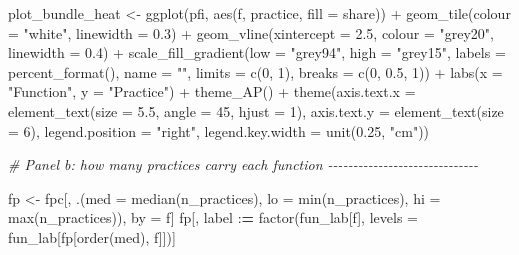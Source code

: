 \documentclass[
  11pt,
]{article}
\newenvironment{Shaded}{\begin{snugshade}}{\end{snugshade}}
\newcommand{\AttributeTok}[1]{\textcolor[rgb]{0.77,0.63,0.00}{#1}}
\newcommand{\CommentTok}[1]{\textcolor[rgb]{0.56,0.35,0.01}{\textit{#1}}}
\newcommand{\DecValTok}[1]{\textcolor[rgb]{0.00,0.00,0.81}{#1}}
\newcommand{\ErrorTok}[1]{\textcolor[rgb]{0.64,0.00,0.00}{\textbf{#1}}}
\newcommand{\FloatTok}[1]{\textcolor[rgb]{0.00,0.00,0.81}{#1}}
\newcommand{\FunctionTok}[1]{\textcolor[rgb]{0.00,0.00,0.00}{#1}}
\newcommand{\NormalTok}[1]{#1}
\newcommand{\OtherTok}[1]{\textcolor[rgb]{0.56,0.35,0.01}{#1}}
\newcommand{\SpecialCharTok}[1]{\textcolor[rgb]{0.00,0.00,0.00}{#1}}
\newcommand{\StringTok}[1]{\textcolor[rgb]{0.31,0.60,0.02}{#1}}
\begin{document}
\begin{Shaded}
\begin{Highlighting}[]
\NormalTok{plot\_bundle\_heat }\OtherTok{\textless{}{-}} \FunctionTok{ggplot}\NormalTok{(pfi, }\FunctionTok{aes}\NormalTok{(f, practice, }\AttributeTok{fill =}\NormalTok{ share)) }\SpecialCharTok{+}
  \FunctionTok{geom\_tile}\NormalTok{(}\AttributeTok{colour =} \StringTok{"white"}\NormalTok{, }\AttributeTok{linewidth =} \FloatTok{0.3}\NormalTok{) }\SpecialCharTok{+}
  \FunctionTok{geom\_vline}\NormalTok{(}\AttributeTok{xintercept =} \FloatTok{2.5}\NormalTok{, }\AttributeTok{colour =} \StringTok{"grey20"}\NormalTok{, }\AttributeTok{linewidth =} \FloatTok{0.4}\NormalTok{) }\SpecialCharTok{+}
  \FunctionTok{scale\_fill\_gradient}\NormalTok{(}\AttributeTok{low =} \StringTok{"grey94"}\NormalTok{, }\AttributeTok{high =} \StringTok{"grey15"}\NormalTok{, }\AttributeTok{labels =} \FunctionTok{percent\_format}\NormalTok{(),}
                      \AttributeTok{name =} \StringTok{""}\NormalTok{, }\AttributeTok{limits =} \FunctionTok{c}\NormalTok{(}\DecValTok{0}\NormalTok{, }\DecValTok{1}\NormalTok{),}
                      \AttributeTok{breaks =} \FunctionTok{c}\NormalTok{(}\DecValTok{0}\NormalTok{, }\FloatTok{0.5}\NormalTok{, }\DecValTok{1}\NormalTok{)) }\SpecialCharTok{+}
  \FunctionTok{labs}\NormalTok{(}\AttributeTok{x =} \StringTok{"Function"}\NormalTok{, }\AttributeTok{y =} \StringTok{"Practice"}\NormalTok{) }\SpecialCharTok{+}
  \FunctionTok{theme\_AP}\NormalTok{() }\SpecialCharTok{+}
  \FunctionTok{theme}\NormalTok{(}\AttributeTok{axis.text.x =} \FunctionTok{element\_text}\NormalTok{(}\AttributeTok{size =} \FloatTok{5.5}\NormalTok{, }\AttributeTok{angle =} \DecValTok{45}\NormalTok{, }\AttributeTok{hjust =} \DecValTok{1}\NormalTok{),}
        \AttributeTok{axis.text.y =} \FunctionTok{element\_text}\NormalTok{(}\AttributeTok{size =} \DecValTok{6}\NormalTok{),}
        \AttributeTok{legend.position =} \StringTok{"right"}\NormalTok{, }\AttributeTok{legend.key.width =} \FunctionTok{unit}\NormalTok{(}\FloatTok{0.25}\NormalTok{, }\StringTok{"cm"}\NormalTok{))}

\CommentTok{\# Panel b: how many practices carry each function {-}{-}{-}{-}{-}{-}{-}{-}{-}{-}{-}{-}{-}{-}{-}{-}{-}{-}{-}{-}{-}{-}{-}{-}{-}{-}{-}{-}{-}{-}}

\NormalTok{fp }\OtherTok{\textless{}{-}}\NormalTok{ fpc[, .(}\AttributeTok{med =} \FunctionTok{median}\NormalTok{(n\_practices), }\AttributeTok{lo =} \FunctionTok{min}\NormalTok{(n\_practices),}
              \AttributeTok{hi =} \FunctionTok{max}\NormalTok{(n\_practices)), by }\OtherTok{=}\NormalTok{ f]}
\NormalTok{fp[, label }\SpecialCharTok{:}\ErrorTok{=} \FunctionTok{factor}\NormalTok{(fun\_lab[f], }\AttributeTok{levels =}\NormalTok{ fun\_lab[fp[}\FunctionTok{order}\NormalTok{(med), f]])]}


\end{Highlighting}
\end{Shaded}
\end{document}
